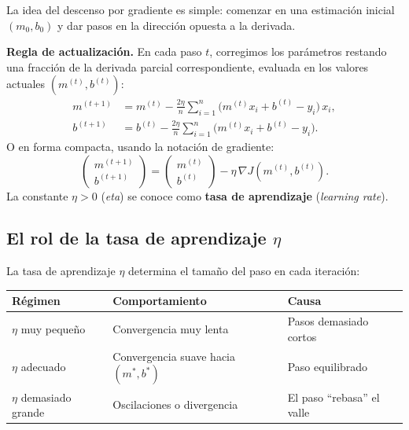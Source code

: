 \documentclass[12pt, a4paper]{article}
\newenvironment{vizdef}{%
    \begin{mdframed}[style=vizazul]
}{%
    \end{mdframed}
}
\newcommand{\grad}{\nabla}
\newcommand{\mstar}{m^{*}}
\newcommand{\bstar}{b^{*}}
\begin{document}
La idea del descenso por gradiente es simple: comenzar en una estimación inicial $(m_0, b_0)$ y dar pasos en la dirección opuesta a la derivada.

\begin{vizdef}
\textbf{Regla de actualización.} En cada paso $t$, corregimos los parámetros
restando una fracción de la derivada parcial correspondiente,
evaluada en los valores actuales $(m^{(t)}, b^{(t)})$:
\begin{align*}
    m^{(t+1)} &= m^{(t)}
      - \frac{2\eta}{n}\sum_{i=1}^{n}\bigl(m^{(t)} x_i + b^{(t)} - y_i\bigr)\,x_i, \\[6pt]
    b^{(t+1)} &= b^{(t)}
      - \frac{2\eta}{n}\sum_{i=1}^{n}\bigl(m^{(t)} x_i + b^{(t)} - y_i\bigr).
\end{align*}
O en forma compacta, usando la notación de gradiente:
\[
    \begin{pmatrix} m^{(t+1)} \\ b^{(t+1)} \end{pmatrix}
    =
    \begin{pmatrix} m^{(t)} \\ b^{(t)} \end{pmatrix}
    - \eta\,\grad J\!\left(m^{(t)}, b^{(t)}\right).
\]
La constante $\eta > 0$ (\textit{eta}) se conoce como \textbf{tasa de aprendizaje}
(\textit{learning rate}).
\end{vizdef}

\subsection{El rol de la tasa de aprendizaje \texorpdfstring{$\eta$}{eta}}

La tasa de aprendizaje $\eta$ determina el tamaño del paso en cada iteración:

\begin{center}
\begin{tabular}{lll}
    \toprule
    Régimen              & Comportamiento                        & Causa \\
    \midrule
    $\eta$ muy pequeño  & Convergencia muy lenta                & Pasos demasiado cortos \\
    $\eta$ adecuado     & Convergencia suave hacia $(\mstar,\bstar)$ & Paso equilibrado \\
    $\eta$ demasiado grande & Oscilaciones o divergencia          & El paso ``rebasa'' el valle \\
    \bottomrule
\end{tabular}
\end{center}
\end{document}
